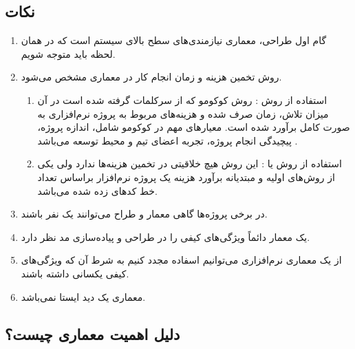 \subsection*{نکات}

\begin{enumerate}
    \item گام اول طراحی، معماری نیازمندی‌های سطح بالای سیستم است که در همان لحظه
    باید متوجه شویم.
    \item روش تخمین هزینه و زمان انجام کار در معماری مشخص می‌شود.
    \begin{enumerate}
        \item استفاده از روش : روش کوکومو که از سرکلمات
         گرفته شده است در آن میزان تلاش، زمان صرف
        شده و هزینه‌های مربوط به پروژه نرم‌افزاری به صورت کامل برآورد شده است.
        معیار‌های مهم در کوکومو شامل، اندازه پروژه، پیچیدگی انجام پروژه، تجربه
        اعضای تیم و محیط توسعه می‌باشد \cite{COCOMO}.
        \item استفاده از روش  یا : این روش هیچ خلاقیتی
        در تخمین هزینه‌ها ندارد ولی یکی از روش‌های اولیه و مبتدیانه برآورد هزینه
        یک پروژه نرم‌افزار براساس تعداد خط کد‌های زده شده می‌باشد.
    \end{enumerate}
    \item در برخی پروژه‌ها گاهی معمار و طراح می‌توانند یک نفر باشند.
    \item یک معمار دائماً ویژگی‌های کیفی را در طراحی و پیاده‌سازی مد نظر دارد.
    \item از یک معماری نرم‌افزاری می‌توانیم اسفاده مجدد کنیم به شرط آن که
    ویژگی‌های کیفی یکسانی داشته باشند.
    \item معماری یک دید ایستا نمی‌باشد.
\end{enumerate}

\subsection{دلیل اهمیت معماری چیست؟}

